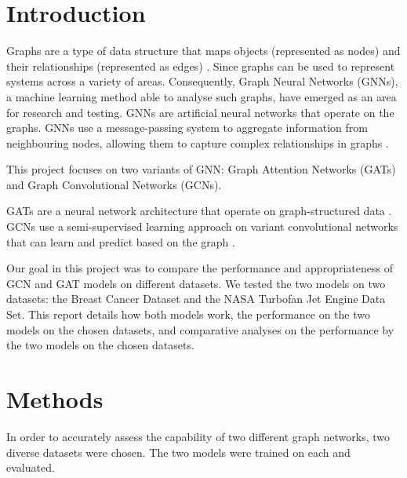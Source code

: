 \documentclass[12pt]{article}
\begin{document}
\pagebreak
\renewcommand{\cftdotsep}{0.5}
\renewcommand{\cftsecleader}{\cftdotfill{\cftdotsep}}
\renewcommand{\contentsname}{Table of Contents}  %
\setlength{\cftbeforesecskip}{10pt}   %
\setlength{\cftbeforesubsecskip}{10pt} %
\setlength{\cftbeforesubsubsecskip}{10pt} %
\renewcommand{\cftsecpresnum}{Chapter~} %
\renewcommand{\cftsecaftersnum}{\quad} 
\setlength{\cftsecnumwidth}{6.1em}   %
\tableofcontents

\pagebreak
{}
\section{Introduction}

Graphs are a type of data structure that maps objects (represented as nodes) and their relationships (represented as edges) \cite{zhouGraphNeuralNetworks2020}.
Since graphs can be used to represent systems across a variety of areas. Consequently, Graph Neural Networks (GNNs), a machine learning method able to analyse such graphs, have emerged as an area for research and testing. GNNs are artificial neural networks that operate on the graphs.
GNNs use a message-passing system to aggregate information from neighbouring nodes, allowing them to capture complex relationships in graphs \cite{wuGraphNeuralNetworks2022}.

This project focuses on two variants of GNN:  Graph Attention Networks (GATs) and Graph Convolutional Networks (GCNs).

GATs are a neural network architecture that operate on graph-structured data \cite{nobleWhatGraphNeural2025}.
GCNs use a semi-supervised learning approach on variant convolutional networks that can learn and predict based on the graph \cite{nobleWhatGraphNeural2025}.

Our goal in this project was to compare the performance and appropriateness of GCN and GAT models on different datasets. We tested the two models on two datasets: the Breast Cancer Dataset and the NASA Turbofan Jet Engine Data Set. This report details how both models work, the performance on the two models on the chosen datasets, and comparative analyses on the performance by the two models on the chosen datasets.


\pagebreak
\section{Methods}
In order to accurately assess the capability of two different graph networks, two diverse datasets were chosen. The two models were trained on each and evaluated.
\end{document}
